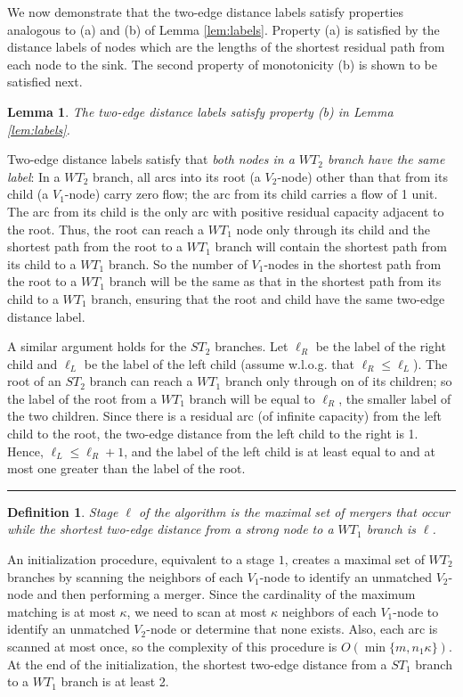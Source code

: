 \documentclass{article}
\newtheorem{lemma}{Lemma}[section]
\newtheorem{definition}{Definition}[section]
\newenvironment{proof}[1][Proof:]{\begin{trivlist}
\item[\hskip \labelsep {\bfseries #1}]}{\end{trivlist}}
\newcommand{\qed}{\hfill \rule{2.5mm}{2.5mm}}
\begin{document}
We now demonstrate that the two-edge distance labels satisfy properties analogous to (a) and (b) of Lemma \ref{lem:labels}. Property (a) is satisfied by the distance labels of nodes which are the lengths of the shortest residual path from each node to the sink.  The second property of monotonicity (b) is shown to be satisfied next.

\begin{lemma}
\label{lem:monotone}
The two-edge distance labels satisfy property (b) in Lemma \ref{lem:labels}.
\end{lemma}

\begin{proof}
Two-edge distance labels satisfy that {\em both nodes in a $WT_2$ branch have the same label}: In a $WT_2$ branch, all arcs into its root (a $V_2$-node) other than that from its child (a $V_1$-node) carry zero flow; the arc from its child carries a flow of 1 unit.  The arc from its child is the only arc with positive residual capacity adjacent to the root. Thus, the root can reach a $WT_1$ node only through its child and the shortest path from the root to a $WT_1$ branch will contain the shortest path from its child to a $WT_1$ branch.  So the number of $V_1$-nodes in the shortest path from the root to a $WT_1$ branch will be the same as that in the shortest path from its child to a $WT_1$ branch, ensuring that the root and child have the same two-edge distance label.

A similar argument holds for the $ST_2$ branches. Let $\ell_R$ be the label of the right child and $\ell_L$ be the label of the left child (assume w.l.o.g. that $\ell_R \leq \ell_L$). The root of an $ST_2$ branch can reach a $WT_1$ branch only through on of its children; so the label of the root from a $WT_1$ branch will be equal to $\ell_R$, the smaller label of the two children. Since there is a residual arc (of infinite capacity) from the left child to the root, the two-edge distance from the left child to the right is 1. Hence, $\ell_L \leq \ell_R+1$, and the label of the left child is at least equal to and at most one greater than the label of the root. \qed
\end{proof}

\begin{definition}
{\em Stage $\ell$} of the algorithm is the maximal set of mergers that occur while the shortest two-edge distance from a strong node to a $WT_1$ branch is $\ell$.
\end{definition}

An initialization procedure, equivalent to a stage $1$, creates a maximal set of $WT_2$ branches by scanning the neighbors of each $V_1$-node to identify an unmatched $V_2$-node and then performing a merger. Since the cardinality of the maximum matching is at most $\kappa$, we need to scan at most $\kappa$ neighbors of each $V_1$-node to identify an unmatched $V_2$-node or determine that none exists. Also, each arc is scanned at most once, so the complexity of this procedure is $O(\min\{m, n_1 \kappa\})$. At the end of the initialization, the shortest two-edge distance from a $ST_1$ branch to a $WT_1$ branch is at least 2.
\end{document}
